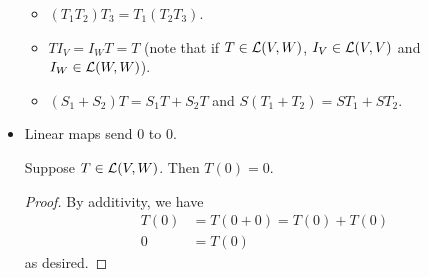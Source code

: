 \documentclass[../main.tex]{subfiles}
\begin{document}
\begin{itemize}
    \begin{itemize}
        \item $(T_1T_2)T_3=T_1(T_2T_3)$.
        \item $TI_V=I_WT=T$ (note that if $T\in\mathcal{L}(V,W)$, $I_V\in\mathcal{L}(V,V)$ and $I_W\in\mathcal{L}(W,W)$).
        \item $(S_1+S_2)T=S_1T+S_2T$ and $S(T_1+T_2)=ST_1+ST_2$.
    \end{itemize}
    \item Linear maps send 0 to 0.
    \begin{theorem}\label{trm:linSendsZero}
        Suppose $T\in\mathcal{L}(V,W)$. Then $T(0)=0$.
        \begin{proof}
            By additivity, we have
            \begin{align*}
                T(0) &= T(0+0) = T(0)+T(0)\\
                0 &= T(0)
            \end{align*}
            as desired.
        \end{proof}
    \end{theorem}
\end{itemize}
\end{document}
